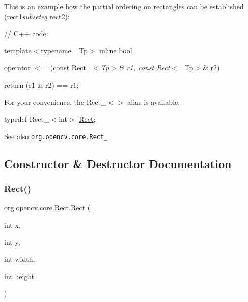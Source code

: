 This is an example how the partial ordering on rectangles can be established (rect1{\itshape subseteq} rect2)\+: {\ttfamily }

{\ttfamily }

{\ttfamily }

{\ttfamily // C++ code\+:}

{\ttfamily }

{\ttfamily }

{\ttfamily template$<$typename \+\_\+\+Tp$>$ inline bool}

{\ttfamily }

{\ttfamily }

{\ttfamily operator $<$= (const Rect\+\_\+$<${\itshape Tp$>$\& r1, const \mbox{\hyperlink{classorg_1_1opencv_1_1core_1_1_rect}{Rect}}}$<$\+\_\+\+Tp$>$\& r2)}

{\ttfamily }

{\ttfamily }

{\ttfamily return (r1 \& r2) == r1;}

{\ttfamily }

{\ttfamily }

{\ttfamily For your convenience, the {\ttfamily Rect\+\_\+$<$$>$} alias is available\+:}

{\ttfamily }

{\ttfamily }

{\ttfamily typedef Rect\+\_\+$<$int$>$ \mbox{\hyperlink{classorg_1_1opencv_1_1core_1_1_rect}{Rect}};}

{\ttfamily }

{\ttfamily \begin{DoxySeeAlso}{See also}
\href{http://docs.opencv.org/modules/core/doc/basic_structures.html#rect}{\tt org.\+opencv.\+core.\+Rect\+\_\+} 
\end{DoxySeeAlso}
}

\subsection{Constructor \& Destructor Documentation}
\mbox{\label{classorg_1_1opencv_1_1core_1_1_rect_a9e3dd6cc71d509db5992260f7c81e0eb}} 
\subsubsection{\texorpdfstring{Rect()}{Rect()}\hspace{0.1cm}{\footnotesize\ttfamily [1/5]}}
{\footnotesize\ttfamily org.\+opencv.\+core.\+Rect.\+Rect (\begin{DoxyParamCaption}\item[{int}]{x,  }\item[{int}]{y,  }\item[{int}]{width,  }\item[{int}]{height }\end{DoxyParamCaption})}

